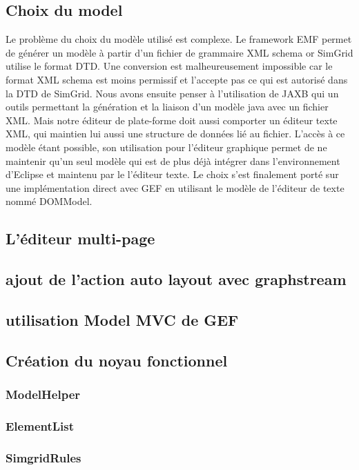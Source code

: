\documentclass{article}
\begin{document}
    \subsection{Choix du model}
    Le problème du choix du modèle utilisé est complexe. Le framework EMF permet de générer un modèle à partir d'un fichier de grammaire XML schema or SimGrid utilise le format DTD. Une conversion est malheureusement impossible car le format XML schema est moins permissif et l'accepte pas ce qui est autorisé dans la DTD de SimGrid.
    Nous avons ensuite penser à l'utilisation de JAXB qui un outils permettant la génération et la liaison d'un modèle java avec un fichier XML. Mais notre éditeur de plate-forme doit aussi comporter un éditeur texte XML, qui maintien lui aussi une structure de données lié au fichier. L'accès à ce modèle étant possible, son utilisation pour l'éditeur graphique permet de ne maintenir qu'un seul modèle qui est de plus déjà intégrer dans l'environnement d'Eclipse et maintenu par le l'éditeur texte.
    Le choix s'est finalement porté sur une implémentation direct avec GEF en utilisant le modèle de l'éditeur de texte nommé DOMModel.
    \subsection{L'éditeur multi-page}
    
    \subsection{ajout de l'action auto layout avec graphstream}
    \subsection{utilisation Model MVC de GEF}
    \subsection{Création du noyau fonctionnel}
        \subsubsection{ModelHelper}
        \subsubsection{ElementList}
        \subsubsection{SimgridRules}
\end{document}
